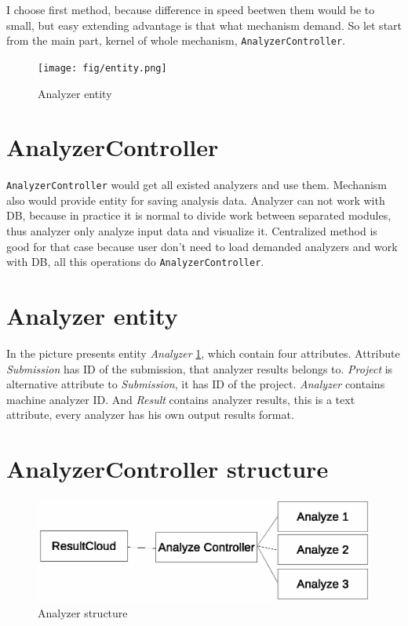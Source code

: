 I choose first method, because difference in speed beetwen them would be to small, but easy extending advantage is that what mechanism demand. So let start from the main part, kernel of whole mechanism, \texttt{AnalyzerController}. 

\begin{figure}
  \centering
    \texttt{[image: fig/entity.png]}
  \caption{Analyzer entity}
  \label{fig:entity}
\end{figure}

\section{AnalyzerController}

\texttt{AnalyzerController} would get all existed analyzers and use them. Mechanism also would provide entity for saving analysis data. Analyzer can not work with DB, because in practice it is normal to divide work between separated modules, thus analyzer only analyze input data and visualize it. Centralized method is good for that case because user don't need to load demanded analyzers and work with DB, all this operations do \texttt{AnalyzerController}.

\section{Analyzer entity}

In the picture presents entity \emph{Analyzer} \ref{fig:entity}, which contain four attributes. Attribute \emph{Submission} has ID of the submission, that analyzer results belongs to. \emph{Project} is alternative attribute to \emph{Submission}, it has ID of the project. \emph{Analyzer} contains machine analyzer ID. And \emph{Result} contains analyzer results, this is a text attribute, every analyzer has his own output results format.

\section{AnalyzerController structure}

\begin{figure}
  \centering
    \includegraphics[trim=0 22cm 0 0,scale=0.8]{fig/analyzer-struct.eps}
  \caption{Analyzer structure}
  \label{fig:an_struct}
\end{figure}

